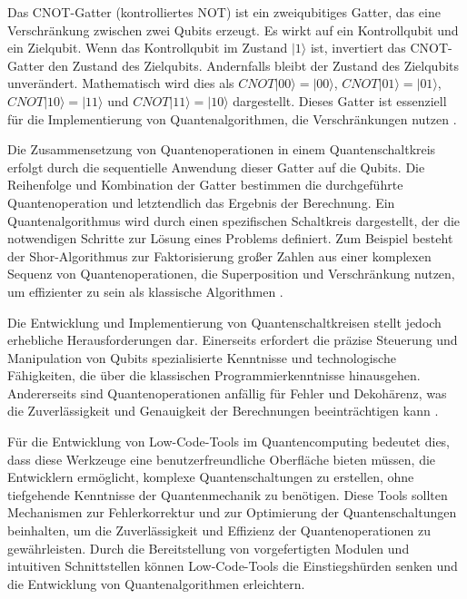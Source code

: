 Das CNOT-Gatter (kontrolliertes NOT) ist ein zweiqubitiges Gatter, das eine Verschränkung 
zwischen zwei Qubits erzeugt. Es wirkt auf ein Kontrollqubit und ein Zielqubit. Wenn das Kontrollqubit 
im Zustand \(|1\rangle\) ist, invertiert das CNOT-Gatter den Zustand des Zielqubits. Andernfalls bleibt 
der Zustand des Zielqubits unverändert. 
Mathematisch wird dies als \( CNOT|00\rangle = |00\rangle \), \( CNOT|01\rangle = |01\rangle \), \( CNOT|10\rangle = |11\rangle \) 
und \( CNOT|11\rangle = |10\rangle \) dargestellt. Dieses Gatter ist essenziell für die Implementierung von 
Quantenalgorithmen, die Verschränkungen nutzen \cite{feynman2018simulating}.

Die Zusammensetzung von Quantenoperationen in einem Quantenschaltkreis erfolgt durch die sequentielle Anwendung 
dieser Gatter auf die Qubits. Die Reihenfolge und Kombination der Gatter bestimmen die durchgeführte 
Quantenoperation und letztendlich das Ergebnis der Berechnung. Ein Quantenalgorithmus wird durch einen 
spezifischen Schaltkreis dargestellt, der die notwendigen Schritte zur Lösung eines Problems definiert. 
Zum Beispiel besteht der Shor-Algorithmus zur Faktorisierung großer Zahlen aus einer komplexen Sequenz von 
Quantenoperationen, die Superposition und Verschränkung nutzen, um effizienter zu sein als klassische Algorithmen \cite{shor1999polynomial}.

Die Entwicklung und Implementierung von Quantenschaltkreisen stellt jedoch erhebliche Herausforderungen 
dar. Einerseits erfordert die präzise Steuerung und Manipulation von Qubits spezialisierte Kenntnisse und 
technologische Fähigkeiten, die über die klassischen Programmierkenntnisse hinausgehen. Andererseits sind 
Quantenoperationen anfällig für Fehler und Dekohärenz, was die Zuverlässigkeit und Genauigkeit der 
Berechnungen beeinträchtigen kann \cite{preskill2018quantum}.

Für die Entwicklung von Low-Code-Tools im Quantencomputing bedeutet dies, dass diese Werkzeuge eine 
benutzerfreundliche Oberfläche bieten müssen, die Entwicklern ermöglicht, komplexe Quantenschaltungen 
zu erstellen, ohne tiefgehende Kenntnisse der Quantenmechanik zu benötigen. Diese Tools sollten Mechanismen 
zur Fehlerkorrektur und zur Optimierung der Quantenschaltungen beinhalten, um die Zuverlässigkeit und 
Effizienz der Quantenoperationen zu gewährleisten. Durch die Bereitstellung von vorgefertigten Modulen 
und intuitiven Schnittstellen können Low-Code-Tools die Einstiegshürden senken und die Entwicklung von 
Quantenalgorithmen erleichtern.

